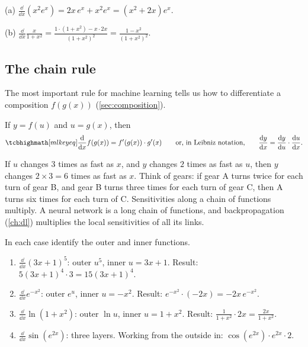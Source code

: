 \begin{example}
(a) $\frac{\dd}{\dd x}\left(x^2e^x\right) = 2x\,e^x + x^2e^x = (x^2 + 2x)e^x$.

(b) $\frac{\dd}{\dd x}\frac{x}{1 + x^2} = \frac{1\cdot(1 + x^2) - x\cdot2x}{(1 +
x^2)^2} = \frac{1 - x^2}{(1 + x^2)^2}$.
\end{example}

\subsection{The chain rule}

The most important rule for machine learning tells us how to differentiate a
composition $f(g(x))$ (\cref{sec:composition}).

\begin{theorem}\label{thm:chain-rule}
If $y = f(u)$ and $u = g(x)$, then
\[
  \keyeq{\frac{\dd}{\dd x}f(g(x)) = f'(g(x))\cdot g'(x)}
  \qquad\text{or, in Leibniz notation,}\qquad
  \deriv{y}{x} = \deriv{y}{u}\cdot\deriv{u}{x}.
\]
\end{theorem}

\begin{intuition}
If $u$ changes $3$ times as fast as $x$, and $y$ changes $2$ times as fast as
$u$, then $y$ changes $2\times3 = 6$ times as fast as $x$. Think of gears: if
gear A turns twice for each turn of gear B, and gear B turns three times for
each turn of gear C, then A turns six times for each turn of C. Sensitivities
along a chain of functions multiply. A neural network is a long chain of
functions, and backpropagation (\cref{ch:dl}) multiplies the local
sensitivities of all its links.
\end{intuition}

\begin{example}\label{ex:chain-rule}
In each case identify the outer and inner functions.
\begin{enumerate}
  \item $\frac{\dd}{\dd x}(3x + 1)^5$: outer $u^5$, inner $u = 3x + 1$. Result:
    $5(3x + 1)^4\cdot3 = 15(3x + 1)^4$.
  \item $\frac{\dd}{\dd x}e^{-x^2}$: outer $e^u$, inner $u = -x^2$. Result:
    $e^{-x^2}\cdot(-2x) = -2x\,e^{-x^2}$.
  \item $\frac{\dd}{\dd x}\ln(1 + x^2)$: outer $\ln u$, inner $u = 1 + x^2$.
    Result: $\frac{1}{1 + x^2}\cdot2x = \frac{2x}{1 + x^2}$.
  \item $\frac{\dd}{\dd x}\sin(e^{2x})$: three layers. Working from the outside
    in: $\cos(e^{2x})\cdot e^{2x}\cdot2$.
\end{enumerate}
\end{example}

